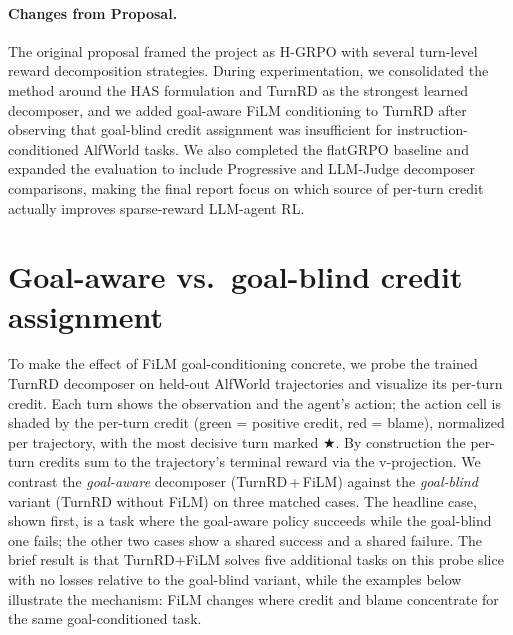 \documentclass{article}
\begin{document}
\paragraph{Changes from Proposal.}
The original proposal framed the project as H-GRPO with several turn-level reward
decomposition strategies. During experimentation, we consolidated the method around the HAS
formulation and TurnRD as the strongest learned decomposer, and we added goal-aware FiLM
conditioning to TurnRD after observing that goal-blind credit assignment was insufficient for
instruction-conditioned AlfWorld tasks. We also completed the flatGRPO baseline and expanded
the evaluation to include Progressive and LLM-Judge decomposer comparisons, making the final
report focus on which source of per-turn credit actually improves sparse-reward LLM-agent RL.




\appendix
\renewcommand{\thesection}{Appendix~\Alph{section}}

\section{Goal-aware vs.\ goal-blind credit assignment}
\label{app:extra}
To make the effect of FiLM goal-conditioning concrete, we probe the trained TurnRD decomposer
on held-out AlfWorld trajectories and visualize its per-turn credit. Each turn shows the
observation and the agent's action; the action cell is shaded by the per-turn credit (green =
positive credit, red = blame), normalized per trajectory, with the most decisive turn marked
$\bigstar$. By construction the per-turn credits sum to the trajectory's terminal reward via
the v-projection. We contrast the \emph{goal-aware} decomposer (TurnRD\,+\,FiLM) against the
\emph{goal-blind} variant (TurnRD without FiLM) on three matched cases. The headline case,
shown first, is a task where the goal-aware policy succeeds while the goal-blind one fails;
the other two cases show a shared success and a shared failure. The brief result is that
TurnRD+FiLM solves five additional tasks on this probe slice with no losses relative to the
goal-blind variant, while the examples below illustrate the mechanism: FiLM changes where
credit and blame concentrate for the same goal-conditioned task.


\end{document}
